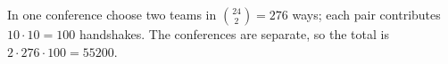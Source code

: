 In one conference choose two teams in $\binom{24}{2}=276$ ways; each pair contributes $10\cdot 10=100$ handshakes. The conferences are separate, so the total is $2\cdot 276\cdot 100=\boxed{55200}$.
